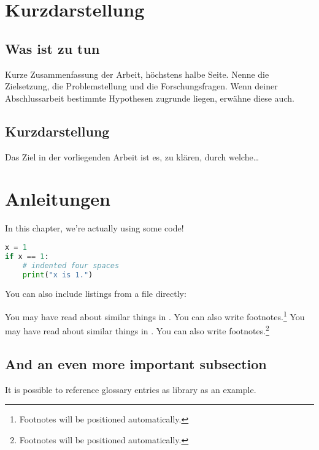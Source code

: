 
\thispagestyle{empty}
\section*{Kurzdarstellung}
\label{sec:kurzdarstellung}

\subsection{Was ist zu tun}
Kurze Zusammenfassung der Arbeit, höchstens halbe Seite.
Nenne die Zielsetzung, die Problemstellung und die Forschungsfragen. Wenn deiner Abschlussarbeit bestimmte Hypothesen zugrunde liegen, erwähne diese auch.


\subsection{Kurzdarstellung}
Das Ziel in der vorliegenden Arbeit ist es, zu klären, durch welche\dots


\section{Anleitungen}
In this chapter, we're actually using some code!

\begin{lstlisting}[language=Python,caption={This is an example of inline listing},captionpos=b]
x = 1
if x == 1:
    # indented four spaces
    print("x is 1.")

\end{lstlisting}

You can also include listings from a file directly:



You may have read about similar things in \cite{Goodliffe2007}.
You can also write footnotes.\footnote{Footnotes will be positioned automatically.}
You may have read about similar things in \cite{Goodliffe2007}.
You can also write footnotes.\footnote{Footnotes will be positioned automatically.}




\subsection{And an even more important subsection}

It is possible to reference glossary entries as \gls{library} as an example.
